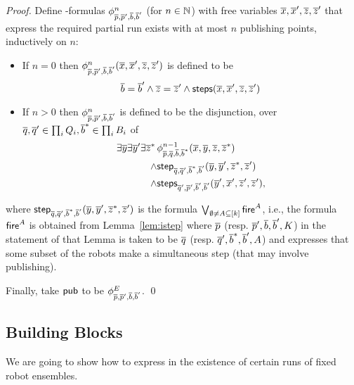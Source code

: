\begin{proof}
Define \msol-formulas $\phi_{\overline{p},\overline{p}',\overline{b},\overline{b}'}^{n}$ (for $n \in \mathbb{N}$) with free variables $\overline{x},\overline{x}',\overline{z},\overline{z}'$ that express the required partial run exists with at most $n$ publishing points, inductively on $n$:
\begin{itemize}
 \item If $n = 0$ then $\phi_{\overline{p},\overline{p}',\overline{b},\overline{b}'}^{n}(\overline{x},\overline{x}',\overline{z},\overline{z}')$ is defined to be 
 \[ \overline{b} = \overline{b}' \wedge  \overline{z} = \overline{z}' \wedge 
     \mathsf{steps}(\overline{x},\overline{x}',\overline{z},\overline{z}') 
 \]
 \item If $n > 0$ then $\phi_{\overline{p},\overline{p}',\overline{b},\overline{b}'}^{n}$ is defined to be the disjunction, over $\overline{q},\overline{q}' \in \prod_i Q_i, 
 \overline{b}^* \in \prod_i B_i$ of 
 \begin{eqnarray*}
  \exists \overline{y} \exists \overline{y}' \exists \overline{z}^*\, 
  & \phi_{\overline{p},\overline{q},\overline{b},\overline{b}^*}^{n-1}(\overline{x},\overline{y},\overline{z},\overline{z}^*) \\
 \wedge &  
  \mathsf{step}_{\overline{q},\overline{q}',\overline{b}^*,\overline{b}'}(\overline{y},\overline{y}',\overline{z}^*,\overline{z}')\\
  \wedge& 
  \mathsf{steps}_{\overline{q}',\overline{p}',\overline{b}',\overline{b}'}(\overline{y}',\overline{x}',\overline{z}',\overline{z}'),
 \end{eqnarray*}
 \end{itemize}
where  $\mathsf{step}_{\overline{q},\overline{q}',\overline{b}^*,\overline{b}'}(\overline{y},\overline{y}',\overline{z}^*,\overline{z}')$
 is the formula $\bigvee_{\emptyset \neq A \subseteq [k]} \mathsf{fire}^A$, i.e., the formula $\mathsf{fire}^A$ is obtained from 
 Lemma~\ref{lem:istep} 
where $\overline{p}$ (resp. $\overline{p}', \overline{b}, \overline{b}',K$) in the statement of that Lemma 
is taken to be $\overline{q}$ (resp. $\overline{q}', \overline{b}^*,\overline{b}', A$) and expresses that some subset of the robots make a simultaneous step (that may involve publishing).

Finally, take $\mathsf{pub}$ to be $\phi_{\overline{p},\overline{p}',\overline{b},\overline{b}'}^{E}$. \qed
\end{proof}

\iffalse
{}
\subsection{\msol Building Blocks}


We are going to show how to express in \msol the existence of certain runs of fixed robot ensembles. 

